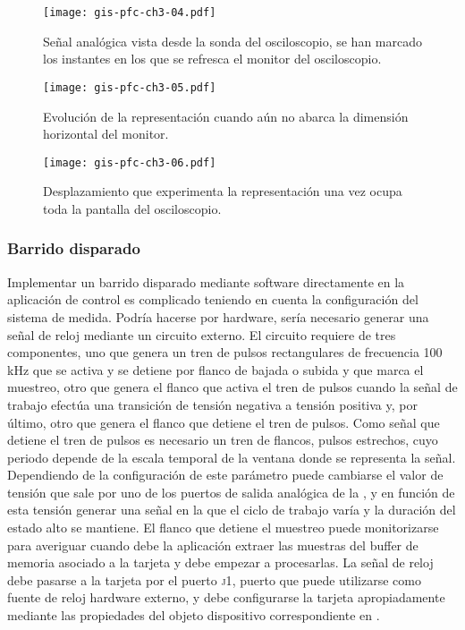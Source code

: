 \begin{figure}
	\begin{center}
		\texttt{[image: gis-pfc-ch3-04.pdf]}
	\end{center}
	\caption[Señal analógica, representación continua]{Señal analógica
	vista desde la sonda del osciloscopio, se han marcado los instantes
	en los que se refresca el monitor del osciloscopio.}
	\label{fig:sigmodcont}
\end{figure}

\begin{figure}
	\begin{center}
		\texttt{[image: gis-pfc-ch3-05.pdf]}
	\end{center}
	\caption[Evolución que sufre la representación]{Evolución de la
	representación cuando aún no abarca la dimensión horizontal del
	monitor.}
	\label{fig:firmodcont}
\end{figure}

\begin{figure}
	\begin{center}
		\texttt{[image: gis-pfc-ch3-06.pdf]}
	\end{center}
	\caption[Desplazamiento que experimenta la
	representación]{Desplazamiento que experimenta la representación
	una vez ocupa toda la pantalla del osciloscopio.}
	\label{fig:desmodcont}
\end{figure}

\subsubsection{Barrido disparado}

Implementar un barrido disparado mediante software directamente en la
aplicación de control es complicado teniendo en cuenta la configuración del
sistema de medida. Podría hacerse por hardware, sería necesario generar una
señal de reloj mediante un circuito externo. El circuito requiere de tres
componentes, uno que genera un tren de pulsos rectangulares de frecuencia
100 kHz que se activa y se detiene por flanco de bajada o subida y que
marca el muestreo, otro que genera el flanco que activa el tren de pulsos
cuando la señal de trabajo efectúa una transición de tensión negativa a
tensión positiva y, por último, otro que genera el flanco que detiene el
tren de pulsos. Como señal que detiene el tren de pulsos es necesario un
tren de flancos, pulsos estrechos, cuyo periodo depende de la escala
temporal de la ventana donde se representa la señal. Dependiendo de la
configuración de este parámetro puede cambiarse el valor de tensión que
sale por uno de los puertos de salida analógica de la \kpci{}, y en función
de esta tensión generar una señal en la que el ciclo de trabajo varía y la
duración del estado alto se mantiene. El flanco que detiene el muestreo
puede monitorizarse para averiguar cuando debe la aplicación extraer las
muestras del buffer de memoria asociado a la tarjeta y debe empezar a
procesarlas. La señal de reloj debe pasarse a la tarjeta por el puerto
\textsc{j1}, puerto que puede utilizarse como fuente de reloj hardware
externo, y debe configurarse la tarjeta apropiadamente mediante las
propiedades del objeto dispositivo correspondiente en \matlab{}.

